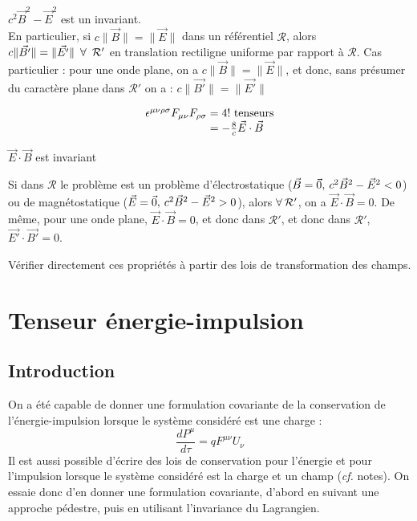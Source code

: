 \begin{conc}
	$c^2\vec{B}^2-\vec{E}^2$ est un invariant.\\
	En particulier, si $c\|\vec{B}\|=\|\vec{E}\|$ dans un référentiel $\mathcal{R}$, alors $c\|\vec{B'}\|=\|\vec{E'}\| \kern 5pt \forall \kern 5pt \mathcal{R'}$ en translation rectiligne uniforme par rapport à $\mathcal{R}$. Cas particulier : pour une onde plane, on a $c\|\vec{B}\|=\|\vec{E}\|$, et donc, sans présumer du caractère plane dans $\mathcal{R'}$ on a : $c\|\vec{B'}\|=\|\vec{E'}\|$
\end{conc}
$$
	\begin{array}{r@{\;}l}
		\epsilon^{\mu\nu\rho\sigma}F_{\mu\nu}F_{\rho\sigma} &= 4!\text{ tenseurs}\\
			&=-\frac{8}{c}\vec{E}\cdot\vec{B}
	\end{array}
$$
\begin{conc}
	$\vec{E}\cdot\vec{B}$ est invariant
\end{conc}
\begin{app}
	Si dans $\mathcal{R}$ le problème est un problème d'électrostatique ($\vec{B}=\vec{0}, \kern 2pt c^2\vec{B}^2-\vec{E}^2<0$) ou de magnétostatique ($\vec{E}=\vec{0}, \kern 2pt c^2\vec{B}^2-\vec{E}^2>0$), alors $\forall \kern 2pt \mathcal{R'}$, on a $\vec{E}\cdot\vec{B}=0$. De m\^eme, pour une onde plane, $\vec{E}\cdot\vec{B}=0$, et donc dans $\mathcal{R'}$, et donc dans $\mathcal{R'}$, $\vec{E'}\cdot\vec{B'}=0$.
\end{app}
\begin{exo}
	Vérifier directement ces propriétés à partir des lois de transformation des champs.
\end{exo}

\section{Tenseur énergie-impulsion}
\subsection{Introduction}
On a été capable de donner une formulation covariante de la conservation de l'énergie-impulsion lorsque le système considéré est une charge :
$$
	\frac{dP^\mu}{d\tau}=qF^{\mu\nu}U_\nu
$$
Il est aussi possible d'écrire des lois de conservation pour l'énergie et pour l'impulsion lorsque le système considéré est la charge et un champ (\emph{cf.} notes). On essaie donc d'en donner une formulation covariante, d'abord en suivant une approche pédestre, puis en utilisant l'invariance du Lagrangien.

